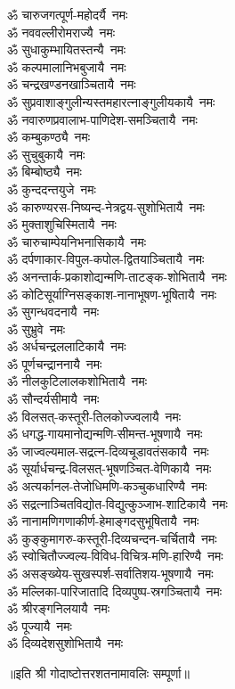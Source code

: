 \begin{multicols}{2}
\begin{flushleft}
ॐ चारुजगत्पूर्ण-महोदर्यै~नमः\\
ॐ नववल्लीरोमराज्यै~नमः\\
ॐ सुधाकुम्भायितस्तन्यै~नमः\\
ॐ कल्पमालानिभबुजायै~नमः\\
ॐ चन्द्रखण्डनखाञ्चितायै~नमः\hfill{}\\
ॐ सुप्रवाशाङ्गुलीन्यस्तमहा\-रत्नाङ्गुलीयकायै~नमः\\
ॐ नवारुणप्रवालाभ-पाणिदेश-समञ्चितायै~नमः\\
ॐ कम्बुकण्ठ्यै~नमः\\
ॐ सुचुबुकायै~नमः\\
ॐ बिम्बोष्ठ्यै~नमः\\
ॐ कुन्ददन्तयुजे~नमः\\
ॐ कारुण्यरस-निष्यन्द-नेत्रद्वय-सुशोभितायै~नमः\\
ॐ मुक्ताशुचिस्मितायै~नमः\\
ॐ चारुचाम्पेयनिभनासिकायै~नमः\\
ॐ दर्पणाकार-विपुल-कपोल-द्वितयाञ्चितायै~नमः\hfill{}\\
ॐ अनन्तार्क-प्रकाशोद्यन्मणि-ताटङ्क-शोभितायै~नमः\\
ॐ कोटिसूर्याग्निसङ्काश-नानाभूषण-भूषितायै~नमः\\
ॐ सुगन्धवदनायै~नमः\\
ॐ सुभ्रुवे~नमः\\
ॐ अर्धचन्द्रललाटिकायै~नमः\\
ॐ पूर्णचन्द्राननायै~नमः\\
ॐ नीलकुटिलालकशोभितायै~नमः\\
ॐ सौन्दर्यसीमायै~नमः\\
ॐ विलसत्-कस्तूरी-तिलकोज्ज्वलायै~नमः\\
ॐ धगद्ध-गायमानोद्यन्मणि-सीमन्त-भूषणायै~नमः\hfill{}\\
ॐ जाज्वल्यमाल-सद्रत्न-दिव्यचूडावतंसकायै~नमः\\
ॐ सूर्यार्धचन्द्र-विलसत्-भूषणञ्चित-वेणिकायै~नमः\\
ॐ अत्यर्कानल-तेजोधिमणि-कञ्चुकधारिण्यै~नमः\\
ॐ सद्रत्नाञ्चितविद्योत-विद्युत्कुञ्जाभ-शाटिकायै~नमः\\
ॐ नानामणिगणाकीर्ण-हेमाङ्गदसुभूषितायै~नमः\\
ॐ कुङ्कुमागरु-कस्तूरी-दिव्यचन्दन-चर्चितायै~नमः\\
ॐ स्वोचितौज्ज्वल्य-विविध-विचित्र-मणि-हारिण्यै~नमः\\
ॐ असङ्ख्येय-सुखस्पर्श-सर्वातिशय-भूषणायै~नमः\\
ॐ मल्लिका-पारिजातादि  दिव्यपुष्प-स्रगञ्चितायै~नमः\\
ॐ श्रीरङ्गनिलयायै~नमः\hfill{}\\
ॐ पूज्यायै~नमः\\
ॐ दिव्यदेशसुशोभितायै~नमः\\
\end{flushleft}
\end{multicols}
॥इति श्री गोदाष्टोत्तरशतनामावलिः सम्पूर्णा॥
